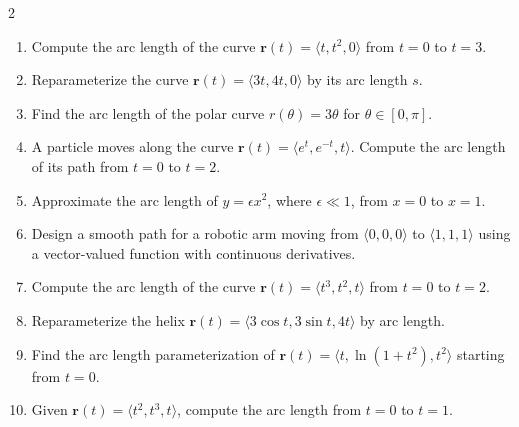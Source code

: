 \begin{multicols}{2}
\begin{enumerate}
    \item Compute the arc length of the curve \( \mathbf{r}(t) = \langle t, t^2, 0 \rangle \) from \( t = 0 \) to \( t = 3 \).
    \item Reparameterize the curve \( \mathbf{r}(t) = \langle 3t, 4t, 0 \rangle \) by its arc length \( s \).
    \item Find the arc length of the polar curve \( r(\theta) = 3\theta \) for \( \theta \in [0, \pi] \).
    \item A particle moves along the curve \( \mathbf{r}(t) = \langle e^t, e^{-t}, t \rangle \). Compute the arc length of its path from \( t = 0 \) to \( t = 2 \).
    \item Approximate the arc length of \( y = \epsilon x^2 \), where \( \epsilon \ll 1 \), from \( x = 0 \) to \( x = 1 \).
    \item Design a smooth path for a robotic arm moving from \( \langle 0, 0, 0 \rangle \) to \( \langle 1, 1, 1 \rangle \) using a vector-valued function with continuous derivatives.
    \item Compute the arc length of the curve \( \mathbf{r}(t) = \langle t^3, t^2, t \rangle \) from \( t = 0 \) to \( t = 2 \).
    \item Reparameterize the helix \( \mathbf{r}(t) = \langle 3\cos t, 3\sin t, 4t \rangle \) by arc length.
    \item Find the arc length parameterization of \( \mathbf{r}(t) = \langle t, \ln(1+t^2), t^2 \rangle \) starting from \( t = 0 \).
    \item Given \( \mathbf{r}(t) = \langle t^2, t^3, t \rangle \), compute the arc length from \( t = 0 \) to \( t = 1 \).


\end{enumerate}
\end{multicols}
